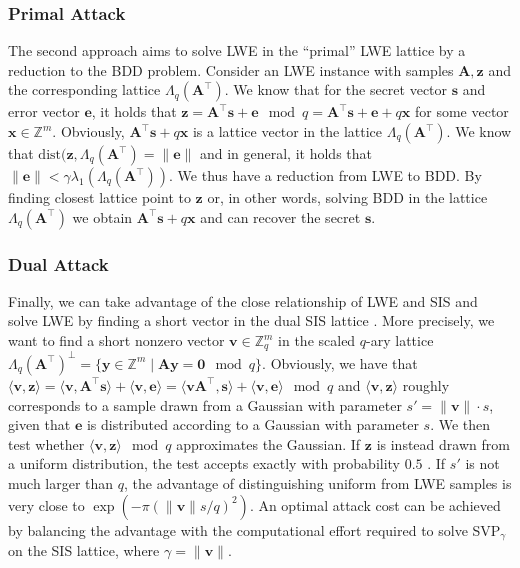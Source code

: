 \subsubsection{Primal Attack}\label{sec:primal-attacks}
The second approach aims to solve LWE in the ``primal'' LWE lattice by a reduction to the BDD problem. Consider an LWE instance with samples $\mathbf{A}, \mathbf{z}$ and the corresponding lattice $\Lambda_q(\mathbf{A}^\intercal)$. We know that for the secret vector $\mathbf{s}$ and error vector $\mathbf{e}$, it holds that $\mathbf{z} = \mathbf{A}^\intercal \mathbf{s} + \mathbf{e} \mod q = \mathbf{A}^\intercal \mathbf{s} + \mathbf{e} + q \mathbf{x}$ for some vector $\mathbf{x} \in \mathbb{Z}^m$. Obviously, $\mathbf{A}^\intercal \mathbf{s} + q \mathbf{x}$ is a lattice vector in the lattice $\Lambda_q(\mathbf{A}^\intercal)$. We know that $\text{dist}(\mathbf{z}, \Lambda_q(\mathbf{A}^\intercal) = \|\mathbf{e}\|$ and in general, it holds that $\|\mathbf{e}\| < \gamma \lambda_1(\Lambda_q(\mathbf{A}^\intercal))$. We thus have a reduction from LWE to BDD. By finding closest lattice point to $\mathbf{z}$ or, in other words, solving BDD in the lattice $\Lambda_q(\mathbf{A}^\intercal)$ we obtain $\mathbf{A}^\intercal \mathbf{s} + q \mathbf{x}$  and can recover the secret $\mathbf{s}$.

\subsubsection{Dual Attack}\label{sec:dual-attacks}
Finally, we can take advantage of the close relationship of LWE and SIS and solve LWE by finding a short vector in the dual SIS lattice \cite{LP11}. More precisely, we want to find a short nonzero vector $\mathbf{v}\in \mathbb{Z}_q^{m}$ in the scaled $q$-ary lattice $\Lambda_q(\mathbf{A}^\intercal)^{\perp} = \{ \mathbf{y} \in \mathbb{Z}^m \mid \mathbf{A} \mathbf{y} = \mathbf{0} \mod q\}$. Obviously, we have that $\langle \mathbf{v}, \mathbf{z} \rangle = \langle \mathbf{v}, \mathbf{A}^\intercal \mathbf{s} \rangle + \langle \mathbf{v}, \mathbf{e}\rangle = \langle \mathbf{v}\mathbf{A}^\intercal,  \mathbf{s} \rangle + \langle \mathbf{v}, \mathbf{e} \rangle \mod q$ and $\langle \mathbf{v}, \mathbf{z} \rangle$ roughly corresponds to a sample drawn from a Gaussian with parameter $s' = \|\mathbf{v}\| \cdot s$, given that $\mathbf{e}$ is distributed according to a Gaussian with parameter $s$. We then test whether $\langle \mathbf{v}, \mathbf{z} \rangle \mod q$ approximates the Gaussian. If $\mathbf{z}$ is instead drawn from a uniform distribution, the test accepts exactly with probability $0.5$ \cite{LP11}. If $s'$ is not much larger than $q$, the advantage of distinguishing uniform from LWE samples is very close to $\exp(-\pi (\| \mathbf{v} \| s/q)^2)$. An optimal attack cost can be achieved by balancing the advantage with the computational effort required to solve SVP$_\gamma$ on the SIS lattice, where $\gamma = \|\mathbf{v}\|$.

